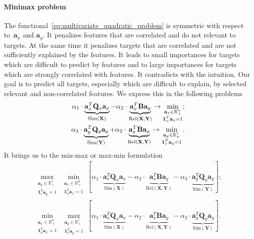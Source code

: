 \documentclass[12pt,twoside]{article}
\newcommand{\ba}{\mathbf{a}}
\newcommand{\bY}{\mathbf{Y}}
\newcommand{\bX}{\mathbf{X}}
\newcommand{\bB}{\mathbf{B}}
\newcommand{\bQ}{\mathbf{Q}}
\newcommand{\bbR}{\mathbb{R}}
\newcommand{\bOne}{\boldsymbol{1}}
\begin{document}
\paragraph{Minimax problem}

The functional~\eqref{eq:multivariate_quadratic_problem} is symmetric with respect to~$\ba_x$ and $\ba_y$. 
It penalizes features that are correlated and do not relevant to targets. 
At the same time it penalizes targets that are correlated and are not sufficiently explained by the features. 
It leads to small importances for targets which are difficult to predict by features and to large importances for targets which are strongly correlated with features. 
It contradicts with the intuition. 
Our goal is to predict all targets, especially which are difficult to explain, by selected relevant and non-correlated features. We express this in the following problems
\begin{align*}
	\alpha_1 \cdot \underbrace{\ba_x^T \bQ_x \ba_x}_{\text{Sim}(\bX)} - \alpha_2 \cdot \underbrace{\vphantom{()} \ba_x^T\mathbf{B} \ba_y}_{\text{Rel}(\bX, \bY)} \rightarrow \min_{\substack{\ba_x \in \bbR^n_+ \\ \bOne_n^T\ba_x=1}}; \\
	\alpha_3 \cdot \underbrace{\ba_y^T \bQ_y \ba_y}_{\text{Sim}(\bY)} + \alpha_2 \cdot \underbrace{\vphantom{()} \ba_x^T \mathbf{B} \ba_y}_{\text{Rel}(\bX, \bY)} \rightarrow \min_{\substack{\ba_y \in \bbR^r_+ \\ \bOne_r^T\ba_y=1}}.
\end{align*}
It brings us to the min-max or max-min formulation
\begin{align}
	\max_{\substack{\ba_y \in \bbR^r_+ \\ \bOne_r^T\ba_y=1}} \min_{\substack{\ba_x \in \bbR^n_+ \\ \bOne_n^T\ba_x=1}} \left[\alpha_1 \cdot \underbrace{\ba_x^T \bQ_x \ba_x}_{\text{Sim}(\bX)} - \alpha_2 \cdot \underbrace{\ba_x^T \bB \ba_y}_{\text{Rel}(\bX, \bY)} - \alpha_3 \cdot \underbrace{\ba_y^T \bQ_y \ba_y}_{\text{Sim}(\bY)} \right];
	\label{eq:maxmin} \\
	\min_{\substack{\ba_x \in \bbR^n_+ \\ \bOne_n^T\ba_x=1}} 	\max_{\substack{\ba_y \in \bbR^r_+ \\ \bOne_r^T\ba_y=1}} \left[\alpha_1 \cdot \underbrace{\ba_x^T \bQ_x \ba_x}_{\text{Sim}(\bX)} - \alpha_2 \cdot \underbrace{\ba_x^T \bB \ba_y}_{\text{Rel}(\bX, \bY)} - \alpha_3 \cdot \underbrace{\ba_y^T \bQ_y \ba_y}_{\text{Sim}(\bY)} \right].
	\label{eq:minmax}
\end{align}
\end{document}
